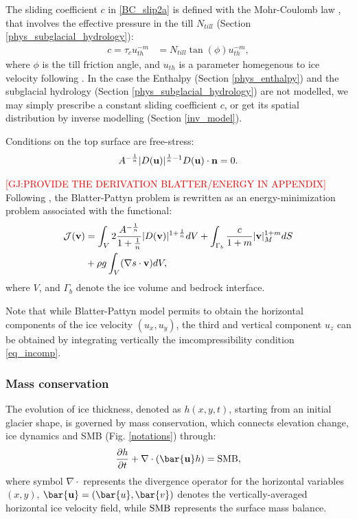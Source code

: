 \documentclass[gmd]{copernicus}
\begin{document}
The sliding coefficient $c$ in \eqref{BC_slip2a} is defined with the Mohr-Coulomb law \citep{Cuffey.2010}, that involves the effective pressure in the till $N_{till}$ (Section \ref{phys_subglacial_hydrology}):
\begin{align}
c  = \tau_c u_{th}^{-m} & = N_{till} \tan(\phi) u_{th}^{-m}, 
\label{sliding_param}
\end{align}
where $\phi$ is the till friction angle, and $u_{th}$ is a parameter homegenous to  ice velocity following \citet{pism-user-manual}. In the case the Enthalpy (Section \ref{phys_enthalpy}) and the subglacial hydrology (Section \ref{phys_subglacial_hydrology}) are not modelled, we may simply prescribe a constant sliding coefficient $c$, or get its spatial distribution by inverse modelling (Section \ref{inv_model}).

Conditions on the top surface are free-stress:
\begin{align}
 A^{-\frac{1}{n}} | D({\bf u}) |^{\frac{1}{n}-1} D({\bf u}) \cdot {\bf n} =  0.
\label{BC_SSA0}
\end{align}  

\textcolor{red}{[GJ:PROVIDE THE DERIVATION BLATTER/ENERGY IN APPENDIX]}
Following \citet{jouvet2016mechanical}, the Blatter-Pattyn problem is rewritten as an energy-minimization problem associated with the functional:
\begin{align}
\mathcal{J} ({\bf v}) & =
\int_{V} 2 \frac{A^{-\frac{1}{n}}}{1+\frac{1}{n}} |  D ({\bf v}) |^{1+\frac{1}{n}}  dV  
+  \int_{\Gamma_b} \frac{c}{1+m}  |{\bf v}|^{1+m}_M   dS  \nonumber \\
& +  \rho g \int_{V} ( \nabla s \cdot {\bf v} ) dV,
\label{functional}
\end{align}
where $V$, and $\Gamma_b$ denote the ice volume and bedrock interface.

Note that while Blatter-Pattyn model permits to obtain the horizontal components of the ice velocity $(u_x,u_y)$, the third and vertical component $u_z$ can be obtained by integrating vertically the imcompressibility condition \eqref{eq_incomp}.

\subsubsection{Mass conservation}
\label{phys_mass_conservation}

The evolution of ice thickness, denoted as $h(x, y, t)$, starting from an initial glacier shape, is governed by mass conservation, which connects elevation change, ice dynamics and SMB (Fig. \ref{notations}) through:
\begin{equation}
\frac{\partial h}{\partial t} + \nabla \cdot \left( \bar{\bf u} h \right) = {\rm SMB},
\label{conservationeq}
\end{equation}
where symbol $\nabla \cdot$ represents the divergence operator for the horizontal variables $(x, y)$, $\bar{\bf u} = (\bar{u}, \bar{v})$ denotes the vertically-averaged horizontal ice velocity field, while ${\rm SMB}$ represents the surface mass balance.
 
\end{document}
